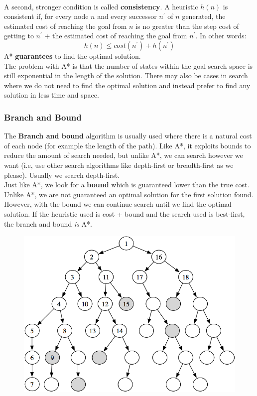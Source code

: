 \documentclass{article}
\newcommand{\n}[0]{\\[\baselineskip]}
\begin{document}
\n
A second, stronger condition is called \textbf{consistency}. A heuristic $h(n)$ is consistent if, for every node $n$ and every successor $n^{\prime}$ of $n$ generated, the estimated cost of reaching the goal from $n$ is no greater than the step cost of getting to $n^{\prime}$ + the estimated cost of reaching the goal from $n^{\prime}$. In other words:
\begin{equation}
h(n) \leq cost(n^{\prime}) + h(n^{\prime})
\end{equation}
A* \textbf{guarantees} to find the optimal solution.
\n
The problem with A* is that the number of states within the goal search space is still exponential in the length of the solution. There may also be cases in search where we do not need to find the optimal solution and instead prefer to find any solution in less time and space. 
\subsubsection{Branch and Bound}
The \textbf{Branch and bound} algorithm is usually used where there is a natural cost of each node (for example the length of the path). Like A*, it exploits bounds to reduce the amount of search needed, but unlike A*, we can search however we want (i.e, use other search algorithms like depth-first or breadth-first as we please). Usually we search depth-first.
\n
Just like A*, we look for a \textbf{bound} which is guaranteed lower than the true cost. Unlike A*, we are not guaranteed an optimal solution for the first solution found. However, with the bound we can continue search until we find the optimal solution. If the heuristic used is cost + bound and the search used is best-first, the branch and bound \textit{is} A*. 
\begin{figure}[H]
\centering
\includegraphics[width=1\textwidth, keepaspectratio]{imgs/branch-and-bound.png}
\end{figure}
\end{document}
